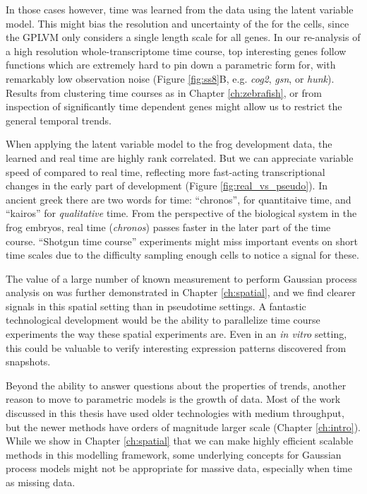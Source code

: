 In those cases however, time was learned from the data using the latent variable model. This might bias the resolution and uncertainty of the  for the cells, since the GPLVM only considers a single length scale for all genes. In our re-analysis of a high resolution whole-transcriptome time course, top interesting genes follow functions which are extremely hard to pin down a parametric form for, with remarkably low observation noise (Figure \ref{fig:ss8}B, e.g. \textit{cog2}, \textit{gsn}, or \textit{hunk}). Results from clustering time courses as in Chapter \ref{ch:zebrafish}, or from inspection of significantly time dependent genes might allow us to restrict the general temporal trends.

When applying the latent variable model to the frog development data, the learned  and real time are highly rank correlated. But we can appreciate variable speed of  compared to real time, reflecting more fast-acting transcriptional changes in the early part of development (Figure \ref{fig:real_vs_pseudo}). In ancient greek there are two words for time: ``chronos'', for quantitaive time, and ``kairos'' for \textit{qualitative} time. From the perspective of the biological system in the frog embryos, real time (\textit{chronos}) passes faster in the later part of the time course. ``Shotgun time course'' experiments might miss important events on short time scales due to the difficulty sampling enough cells to notice a signal for these.

The value of a large number of known measurement to perform Gaussian process analysis on was further demonstrated in Chapter \ref{ch:spatial}, and we find clearer signals in this spatial setting than in pseudotime settings. A fantastic technological development would be the ability to parallelize time course experiments the way these spatial experiments are. Even in an \textit{in vitro} setting, this could be valuable to verify interesting expression patterns discovered from snapshots.

Beyond the ability to answer questions about the properties of trends, another reason to move to parametric models is the growth of data. Most of the work discussed in this thesis have used older technologies with medium throughput, but the newer methods have orders of magnitude larger scale (Chapter \ref{ch:intro}). While we show in Chapter \ref{ch:spatial} that we can make highly efficient scalable methods in this modelling framework, some underlying concepts for Gaussian process models might not be appropriate for massive data, especially when  time as missing data.

